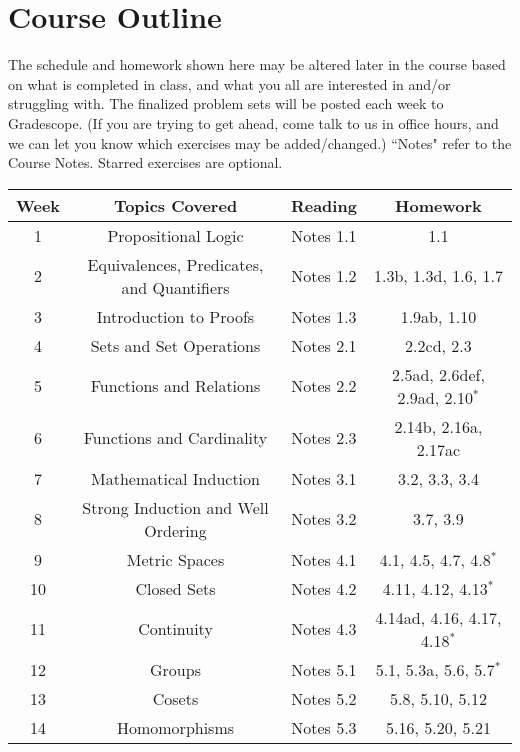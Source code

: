 \documentclass[11pt, a4paper]{article}
\begin{document}
\section*{Course Outline}
The schedule and homework shown here may be altered later in the course based on what is completed in class, and what you all are interested in and/or struggling with. The finalized problem sets will be posted each week to Gradescope. (If you are trying to get ahead, come talk to us in office hours, and we can let you know which exercises may be added/changed.) ``Notes" refer to the Course Notes. Starred exercises are optional.
\begin{center}
\begin{tabular}{|c|c|c|c|}
    \hline
     Week &  \qquad\qquad Topics Covered \qquad \qquad & Reading &Homework\\
     \hline
     1 & Propositional Logic & Notes 1.1 & 1.1\\
     2 & Equivalences, Predicates, and Quantifiers & Notes 1.2 & 1.3b, 1.3d, 1.6, 1.7\\
     3 & Introduction to Proofs & Notes 1.3 & 1.9ab, 1.10\\
     4 & Sets and Set Operations & Notes 2.1 & 2.2cd, 2.3\\
     5 & Functions and Relations & Notes 2.2 & 2.5ad, 2.6def, 2.9ad, 2.10$^*$\\
     6 & Functions and Cardinality & Notes 2.3 & 2.14b, 2.16a, 2.17ac \\
     7 & Mathematical Induction & Notes 3.1 & 3.2, 3.3, 3.4\\
     8 & Strong Induction and Well Ordering & Notes 3.2 & 3.7, 3.9\\
     9 & Metric Spaces & Notes 4.1 & 4.1, 4.5, 4.7, 4.8$^*$\\
     10 & Closed Sets & Notes 4.2 & 4.11, 4.12, 4.13$^*$ \\
     11 & Continuity & Notes 4.3 & 4.14ad, 4.16, 4.17, 4.18$^*$\\
     12 & Groups & Notes 5.1 & 5.1, 5.3a, 5.6, 5.7$^*$\\
     13 & Cosets & Notes 5.2 & 5.8, 5.10, 5.12\\
     14 & Homomorphisms & Notes 5.3 & 5.16, 5.20, 5.21\\
     \hline
\end{tabular}
\end{center}
 
\end{document}

